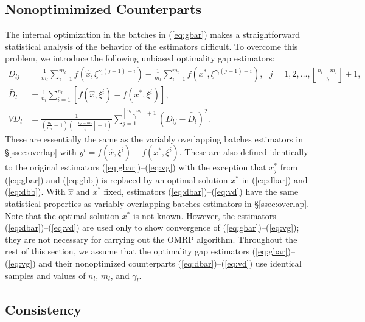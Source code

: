 \documentclass[12pt]{article}
\newcommand{\x}{x}
\newcommand{\xh}{{\hat{\x}}}
\newcommand{\xs}{\x^*}
\newcommand{\xit}{\xi}
\newcommand{\xiti}{\xit^i}
\newcommand{\nbl}{\left\lfloor\tfrac{n_l-m_l}{\gamma_l}\right\rfloor+1}
\newcommand{\db}{\bar{D}}
\newcommand{\dbb}{\bar{\db}}
\begin{document}



\subsection{Nonoptimimized Counterparts}
\label{subsec:nonO}

The internal optimization in the batches in (\ref{eq:gbar}) makes a straightforward statistical analysis of the behavior of the estimators difficult.  
To overcome this problem, we introduce the following unbiased optimality gap estimators:
\begin{align}
	\db_{lj} & = \frac{1}{m_l} \sum_{i=1}^{m_l} f(\xh,\xit^{\gamma_l(j-1)+i}) - \frac{1}{m_l} \sum_{i=1}^{m_l} f(\xs,\xit^{\gamma_l(j-1)+i}),\ \ \ j = 1, 2, \dots, \nbl, \label{eq:dbar} \\
	\dbb_l & = \frac{1}{n_l} \sum_{i=1}^{n_l} \left[ f(\xh,\xiti) - f(\xs,\xiti) \right], \label{eq:dbb} \\
	VD_l & = \frac{1}{\left( \tfrac{n_l}{m_l} - 1 \right) \left(\nbl\right)} \sum_{j=1}^{\nbl} (\db_{lj} - \dbb_l)^2. \label{eq:vd}
\end{align}
These are essentially the same as the variably overlapping batches estimators in \S \ref{ssec:overlap} with $y^i = f(\xh,\xiti) - f(\xs,\xiti)$.  
These are also defined identically to the original estimators (\ref{eq:gbar})--(\ref{eq:vg}) with the exception that $\xs_j$ from (\ref{eq:gbar}) and (\ref{eq:gbb}) is replaced by an optimal solution $\xs$ in (\ref{eq:dbar}) and (\ref{eq:dbb}).  
With $\xh$ and $\xs$ fixed, estimators (\ref{eq:dbar})--(\ref{eq:vd}) have the same statistical properties as variably overlapping batches estimators in \S \ref{ssec:overlap}.  
Note that the optimal solution $\xs$ is not known. 
However, the estimators (\ref{eq:dbar})--(\ref{eq:vd}) are used only to show convergence of (\ref{eq:gbar})--(\ref{eq:vg}); they are not necessary for carrying out the OMRP algorithm.  
Throughout the rest of this section, we assume that the optimality gap estimators (\ref{eq:gbar})--(\ref{eq:vg}) and their nonoptimized counterparts (\ref{eq:dbar})--(\ref{eq:vd}) use identical samples and values of $n_
l$, 
$m_l$, and $\gamma_l$.  \smallskip 


\subsection{Consistency}
\label{subsec:conv} 
\end{document}
